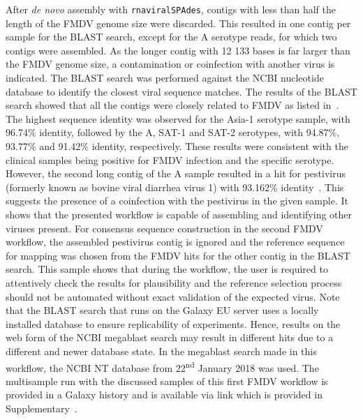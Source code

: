 After \textit{de novo} assembly with \texttt{rnaviralSPAdes}, contigs with less than half the length of the \ac{FMDV} genome size were discarded. This resulted in one contig per sample for the \ac{BLAST} search, except for the A serotype reads, for which two contigs were assembled. As the longer contig with 12 133 bases is far larger than the \ac{FMDV} genome size, a contamination or coinfection with another virus is indicated. The \ac{BLAST} search was performed against the \ac{NCBI} nucleotide database to identify the closest viral sequence matches. The results of the \ac{BLAST} search showed that all the contigs were closely related to \ac{FMDV} as listed in~. The highest sequence identity was observed for the Asia-1 serotype sample, with 96.74\% identity, followed by the A, SAT-1 and SAT-2 serotypes, with 94.87\%, 93.77\% and 91.42\% identity, respectively. These results were consistent with the clinical samples being positive for \ac{FMDV} infection and the specific serotype. However, the second long contig of the A sample resulted in a hit for pestivirus (formerly known as bovine viral diarrhea virus 1) with 93.162\% identity~\cite{smith2017proposed}. This suggests the presence of a coinfection with the pestivirus in the given sample. It shows that the presented workflow is capable of assembling and identifying other viruses present. For consensus sequence construction in the second \ac{FMDV} workflow, the assembled pestivirus contig is ignored and the reference sequence for mapping was chosen from the \ac{FMDV} hits for the other contig in the \ac{BLAST} search. This sample shows that during the workflow, the user is required to attentively check the results for plausibility and the reference selection process should not be automated without exact validation of the expected virus. Note that the \ac{BLAST} search that runs on the Galaxy EU server uses a locally installed database to ensure replicability of experiments. Hence, results on the web form of the \ac{NCBI} megablast search may result in different hits due to a different and newer database state. In the megablast search made in this workflow, the \ac{NCBI} NT database from 22\textsuperscript{nd} January 2018 was used. The multisample run with the discussed samples of this first \ac{FMDV} workflow is provided in a Galaxy history and is available via link which is provided in Supplementary~.\\

